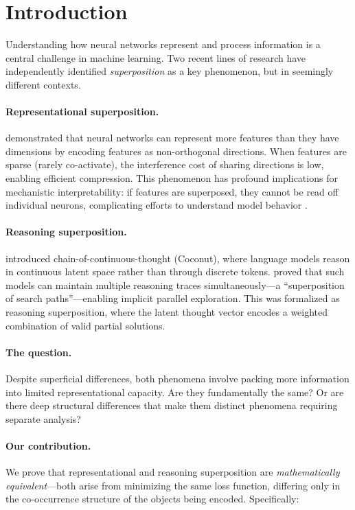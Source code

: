\section{Introduction}
\label{sec:intro}

Understanding how neural networks represent and process information is a central challenge in machine learning. Two recent lines of research have independently identified \emph{superposition} as a key phenomenon, but in seemingly different contexts.

\paragraph{Representational superposition.} \citet{elhage2022toy} demonstrated that neural networks can represent more features than they have dimensions by encoding features as non-orthogonal directions. When features are sparse (rarely co-activate), the interference cost of sharing directions is low, enabling efficient compression. This phenomenon has profound implications for mechanistic interpretability: if features are superposed, they cannot be read off individual neurons, complicating efforts to understand model behavior \citep{bricken2023monosemanticity, templeton2024scaling}.

\paragraph{Reasoning superposition.} \citet{hao2024training} introduced chain-of-continuous-thought (Coconut), where language models reason in continuous latent space rather than through discrete tokens. \citet{zhu2025reasoning} proved that such models can maintain multiple reasoning traces simultaneously---a ``superposition of search paths''---enabling implicit parallel exploration. This was formalized as reasoning superposition, where the latent thought vector encodes a weighted combination of valid partial solutions.

\paragraph{The question.} Despite superficial differences, both phenomena involve packing more information into limited representational capacity. Are they fundamentally the same? Or are there deep structural differences that make them distinct phenomena requiring separate analysis?

\paragraph{Our contribution.} We prove that representational and reasoning superposition are \emph{mathematically equivalent}---both arise from minimizing the same loss function, differing only in the co-occurrence structure of the objects being encoded. Specifically:

